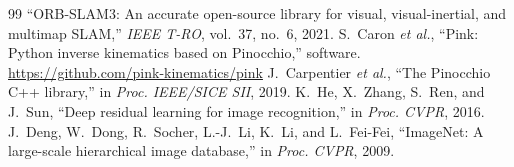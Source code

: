\documentclass[conference,10pt]{IEEEtran}
\begin{document}
\begin{thebibliography}{99}
``ORB-SLAM3: An accurate open-source library for visual, visual-inertial, and multimap SLAM,'' \emph{IEEE T-RO}, vol.~37,
no.~6, 2021.
 S.~Caron \emph{et al.}, ``Pink: Python inverse kinematics based on Pinocchio,'' software.
\url{https://github.com/pink-kinematics/pink}
 J.~Carpentier \emph{et al.}, ``The Pinocchio C++ library,'' in \emph{Proc. IEEE/SICE
SII}, 2019.
 K.~He, X.~Zhang, S.~Ren, and J.~Sun, ``Deep residual learning for image recognition,'' in
\emph{Proc. CVPR}, 2016.
 J.~Deng, W.~Dong, R.~Socher, L.-J.~Li, K.~Li, and L.~Fei-Fei, ``ImageNet: A large-scale
hierarchical image database,'' in \emph{Proc. CVPR}, 2009.
\end{thebibliography}
\end{document}
